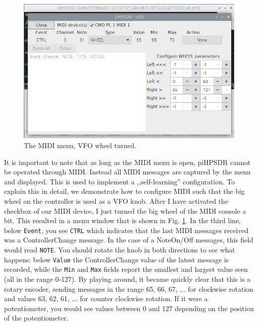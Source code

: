 \documentclass[12pt]{book}
\def\rett#1{\texttt{\color{red}#1}}
\begin{document}
\begin{figure}[ht]
\center
\includegraphics[width=12cm]{MIDImenu2.png}
\caption{The MIDI menu, VFO wheel turned.}
\label{fig:MIDImenu2}
\end{figure}

It is important to note that as long as the MIDI menu is open, piHPSDR cannot be
operated through MIDI. Instead all MIDI messages are captured by the menu and
displayed. This is used to implement a ,,self-learning'' configuration. To explain
this in detail, we demonstrate how to configure MIDI such that the big wheel on the
controller is used as a VFO knob. After I have activated the checkbox of our
MIDI device, I just turned the big wheel of the MIDI console a bit. This resulted
in a menu window that is shown in Fig. \ref{fig:MIDImenu2}. In the third line,
below \rett{Event}, you see \texttt{CTRL} which indicates that the last MIDI messages
received was a ControllerChange message. In the case of a NoteOn/Off messages, this
field would read \texttt{NOTE}. You should rotate the knob in both directions to
see what happens: below \rett{Value} the ControllerChange value of the latest
message is recorded, while the \rett{Min} and \rett{Max} fields report the smallest
and largest value seen (all in the range 0-127). By playing around, it became
quickly clear that this is a rotary encoder, sending messages in the range 65, 66, 67,
$\ldots$ for clockwise rotation and values 63, 62, 61, $\ldots$ for counter clockwise
rotation. If it were a potentiometer, you would see values between 0 and 127 
depending on the position of the potentiometer.
\end{document}
